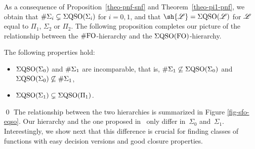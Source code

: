 As a consequence of Proposition~\ref{theo-pnf-snf} and Theorem~\ref{theo-pi1-pnf}, we obtain that $\#\Sigma_{i} \subsetneq \Sigma{\rm QSO}(\Sigma_{i})$ for $i = 0,1$, and that $\sh{\LL} = \eqso(\LL)$ for $\mathscr{L}$ equal to  $\Pi_1$, $\Sigma_2$ or $\Pi_2$. The following proposition completes our picture of the relationship between the $\#{\rm FO}$-hierarchy and the $\Sigma{\rm QSO}({\rm FO})$-hierarchy.
\begin{prop}\label{prop-rest}
The following properties hold:
\begin{itemize}
\item $\Sigma{\rm QSO}(\Sigma_{0})$ and $\#\Sigma_{1}$ are incomparable, that is, $\#\Sigma_{1} \not\subseteq \Sigma{\rm QSO}(\Sigma_{0})$ and $\Sigma{\rm QSO}(\Sigma_{0}) \not\subseteq \#\Sigma_{1}$,
\item $\Sigma{\rm QSO}(\Sigma_{1}) \subsetneq \Sigma{\rm QSO}(\Pi_{1})$.
\end{itemize}
\end{prop}
\proof

\qed
The relationship between the two hierarchies is summarized in Figure \ref{fig-sfo-eqso}.
Our hierarchy and the one proposed in~\cite{SalujaST95} only differ in~$\Sigma_0$ and~$\Sigma_1$. 
Interestingly, we show next that this difference is crucial for finding classes of functions with easy decision versions and good closure properties.

